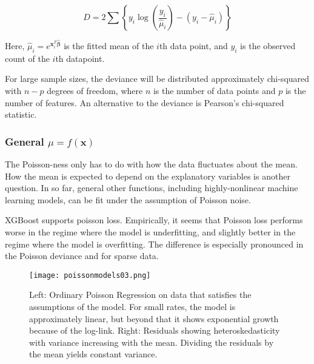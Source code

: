 \begin{equation}
D = 2\sum\left\{ y_i \log\left( \frac{y_i}{\hat{\mu}_i} \right) - \left( y_i - \hat{\mu}_i \right) \right\}
\end{equation}

Here, $\hat{\mu}_i = e^{\mathbf{x}^T_i \hat{\mathbf{\beta}}}$ is the fitted mean of the $i$th data point, and $y_i$ is the observed count of the $i$th datapoint. 

For large sample sizes, the deviance will be distributed approximately chi-squared with $n-p$ degrees of freedom, where $n$ is the number of data points and $p$ is the number of features. An alternative to the deviance is Pearson's chi-squared statistic. 

\subsubsection{General $\mu = f(\mathbf{x})$}
The Poisson-ness only has to do with how the data fluctuates about the mean. How the mean is expected to depend on the explanatory variables is another question. In so far, general other functions, including highly-nonlinear machine learning models, can be fit under the assumption of Poisson noise.

XGBoost supports poisson loss. Empirically, it seems that Poisson loss performs worse in the regime where the model is underfitting, and slightly better in the regime where the model is overfitting. The difference is especially pronounced in the Poisson deviance and for sparse data.


\begin{figure}
\centering
    \texttt{[image: poissonmodels03.png]}
    \caption{Left: Ordinary Poisson Regression on data that satisfies the assumptions of the model. For small rates, the model is approximately linear, but beyond that it shows exponential growth because of the log-link. Right: Residuals showing heteroskedasticity with variance increasing with the mean. Dividing the residuals by the mean yields constant variance.}
    \label{fig:ordinarypoisson}
\end{figure}